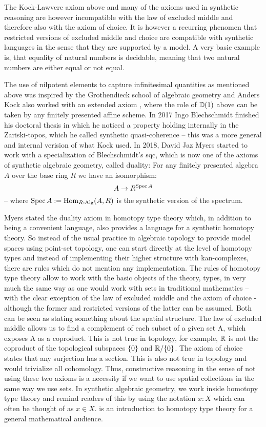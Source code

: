 The Kock-Lawvere axiom above and many of the axioms used in synthetic reasoning are however incompatible with the law of excluded middle and therefore also with the axiom of choice. It is however a recurring phenomen that restricted versions of excluded middle and choice are compatible with synthetic languages in the sense that they are supported by a model. A very basic example is, that equality of natural numbers is decidable, meaning that two natural numbers are either equal or not equal. 

The use of nilpotent elements to capture infinitesimal quantities as mentioned above was inspired by the Grothendieck school of algebraic geometry and Anders Kock also worked with an extended axiom \cite{Kock74}, where the role of $\mathbb{D}(1)$ above can be taken by any finitely presented affine scheme. In 2017 Ingo Blechschmidt finished his doctoral thesis in which he noticed a property holding internally in the Zariski-topos, which he called synthetic quasi-coherence -- this was a more general and internal verision of what Kock used. In 2018, David Jaz Myers started to work with a specialization of Blechschmidt's sqc, which is now one of the axioms of synthetic algebraic geometry, called duality: For any finitely presented algebra $A$ over the base ring $R$ we have an isomorphism:
\[ A\to R^{\operatorname{Spec} A}\]
-- where $\operatorname{Spec} A:=\mathrm{Hom}_{R\text{-}\mathrm{Alg}}(A,R)$ is the synthetic version of the spectrum.

Myers stated the duality axiom in homotopy type theory which, in addition to being a convenient language, also provides a language for a synthetic homotopy theory.
So instead of the usual practice in algebraic topology to provide model spaces using point-set topology, one can start directly at the level of homotopy types and instead of implementing their higher structure with kan-complexes, there are rules which do not mention any implementation.
The rules of homotopy type theory allow to work with the basic objects of the theory, types, in very much the same way as one would work with sets in traditional mathematics -- with the clear exception of the law of excluded middle and the axiom of choice - although the former and restricted versions of the latter can be assumed.
Both can be seen as stating something about the spatial structure. The law of excluded middle allows us to find a complement of each subset of a given set A, which exposes A as a coproduct.
This is not true in topology, for example, $\mathbb{R}$ is not the coproduct of the topological subspaces $\{0\}$ and $\mathbb{R}/\{0\}$.
The axiom of choice states that any surjection has a section. This is also not true in topology and would trivialize all cohomology.
Thus, constructive reasoning in the sense of not using these two axioms is a necessity if we want to use spatial collections in the same way we use sets.
In synthetic algebraic geometry, we work inside homotopy type theory and remind readers of this by using the notation $x:X$ which can often be thought of as $x\in X$.
\cite{shulman-logic-of-spaces} is an introduction to homotopy type theory for a general mathematical audience.


